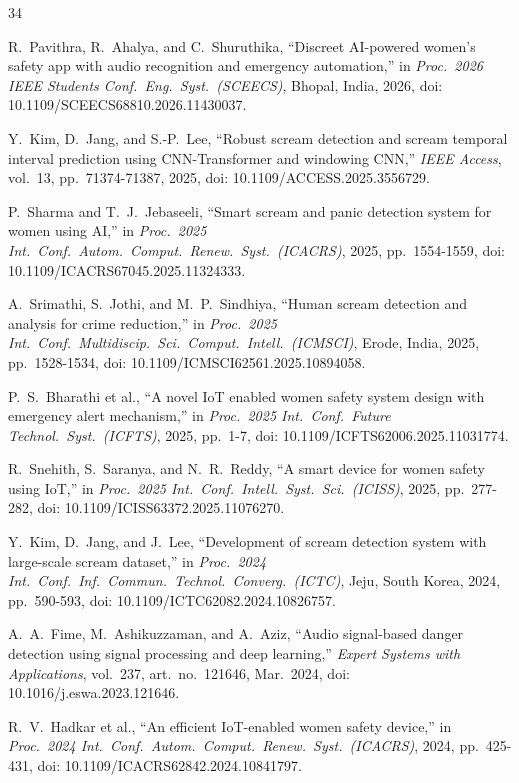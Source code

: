 \documentclass[12pt,a4paper]{report}
\begin{document}
\begin{thebibliography}{34}

R.~Pavithra, R.~Ahalya, and C.~Shuruthika, ``Discreet AI-powered
women's safety app with audio recognition and emergency automation,''
in \emph{Proc.\ 2026 IEEE Students Conf.\ Eng.\ Syst.\ (SCEECS)},
Bhopal, India, 2026, doi: 10.1109/SCEECS68810.2026.11430037.

Y.~Kim, D.~Jang, and S.-P.~Lee, ``Robust scream detection and scream
temporal interval prediction using CNN-Transformer and windowing
CNN,'' \emph{IEEE Access}, vol.~13, pp.~71374-71387, 2025, doi:
10.1109/ACCESS.2025.3556729.

P.~Sharma and T.~J.~Jebaseeli, ``Smart scream and panic detection
system for women using AI,'' in \emph{Proc.\ 2025 Int.\ Conf.\ Autom.\
Comput.\ Renew.\ Syst.\ (ICACRS)}, 2025, pp.~1554-1559, doi:
10.1109/ICACRS67045.2025.11324333.

A.~Srimathi, S.~Jothi, and M.~P.~Sindhiya, ``Human scream detection
and analysis for crime reduction,'' in \emph{Proc.\ 2025 Int.\ Conf.\
Multidiscip.\ Sci.\ Comput.\ Intell.\ (ICMSCI)}, Erode, India, 2025,
pp.~1528-1534, doi: 10.1109/ICMSCI62561.2025.10894058.

P.~S.~Bharathi et al., ``A novel IoT enabled women safety system
design with emergency alert mechanism,'' in \emph{Proc.\ 2025 Int.\
Conf.\ Future Technol.\ Syst.\ (ICFTS)}, 2025, pp.~1-7, doi:
10.1109/ICFTS62006.2025.11031774.

\bibitem{snehith}
R.~Snehith, S.~Saranya, and N.~R.~Reddy, ``A smart device for women
safety using IoT,'' in \emph{Proc.\ 2025 Int.\ Conf.\ Intell.\ Syst.\
Sci.\ (ICISS)}, 2025, pp.~277-282, doi:
10.1109/ICISS63372.2025.11076270.

\bibitem{kimscream}
Y.~Kim, D.~Jang, and J.~Lee, ``Development of scream detection system
with large-scale scream dataset,'' in \emph{Proc.\ 2024 Int.\ Conf.\
Inf.\ Commun.\ Technol.\ Converg.\ (ICTC)}, Jeju, South Korea, 2024,
pp.~590-593, doi: 10.1109/ICTC62082.2024.10826757.

\bibitem{fime}
A.~A.~Fime, M.~Ashikuzzaman, and A.~Aziz, ``Audio signal-based danger
detection using signal processing and deep learning,'' \emph{Expert
Systems with Applications}, vol.~237, art.\ no.~121646, Mar.\ 2024,
doi: 10.1016/j.eswa.2023.121646.

\bibitem{hadkar}
R.~V.~Hadkar et al., ``An efficient IoT-enabled women safety device,''
in \emph{Proc.\ 2024 Int.\ Conf.\ Autom.\ Comput.\ Renew.\ Syst.\
(ICACRS)}, 2024, pp.~425-431, doi:
10.1109/ICACRS62842.2024.10841797.


\end{thebibliography}
\end{document}
